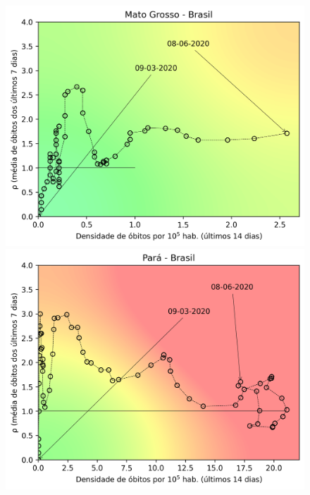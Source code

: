 \documentclass[]{article}
\begin{document}
\begin{figure}[!h]
	\begin{minipage}[t]{4cm}
		\centering
		\includegraphics[scale=0.5]{../MT.png}
	\end{minipage}
	\hspace{5cm}
	\begin{minipage}[t]{4cm}
		\centering
		\includegraphics[scale=0.5]{../PA.png}
		\vspace{0.2cm}
	\end{minipage}
	

\end{figure}
\end{document}
